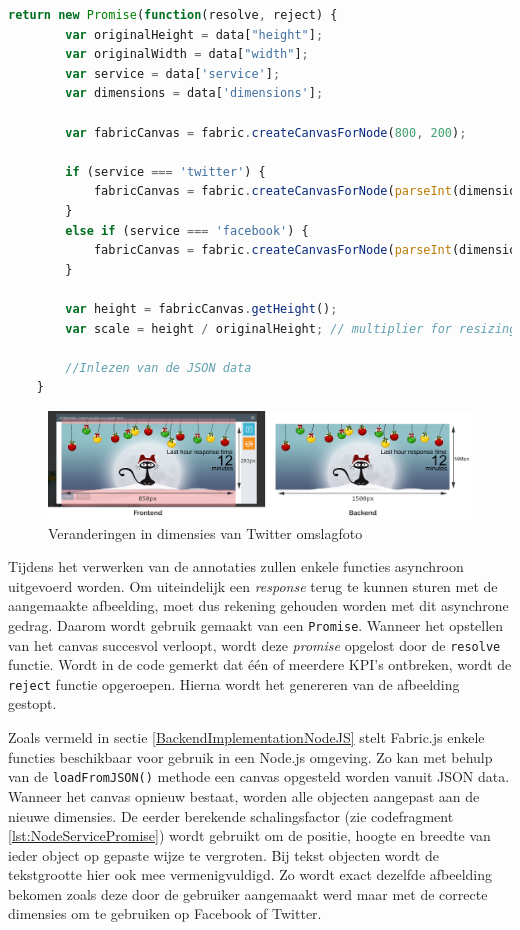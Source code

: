 \begin{lstlisting}[caption={renderer.js - Image renderer},label=lst:NodeServicePromise,language=javascript]
	return new Promise(function(resolve, reject) {
		var originalHeight = data["height"];
		var originalWidth = data["width"];
		var service = data['service'];
		var dimensions = data['dimensions'];
		
		var fabricCanvas = fabric.createCanvasForNode(800, 200);
		
		if (service === 'twitter') {
			fabricCanvas = fabric.createCanvasForNode(parseInt(dimensions.width), parseInt(dimensions.height));
		}
		else if (service === 'facebook') {
			fabricCanvas = fabric.createCanvasForNode(parseInt(dimensions.width),  parseInt(dimensions.height));
		}
		
		var height = fabricCanvas.getHeight();
		var scale = height / originalHeight; // multiplier for resizing canvas + objects
		
		//Inlezen van de JSON data
	}
\end{lstlisting}

\begin{figure}[H]
	\centering
	\includegraphics[width=1\textwidth]{Figuren/FrontToBack.png}
	\caption{Veranderingen in dimensies van Twitter omslagfoto}
	\label{fig:FrontToBackend}
\end{figure} 

Tijdens het verwerken van de annotaties zullen enkele functies asynchroon uitgevoerd worden. Om uiteindelijk een \textit{response} terug te kunnen sturen met de aangemaakte afbeelding, moet dus rekening gehouden worden met dit asynchrone gedrag. Daarom wordt gebruik gemaakt van een \texttt{Promise}. Wanneer het opstellen van het canvas succesvol verloopt, wordt deze \textit{promise} opgelost door de \texttt{resolve} functie. Wordt in de code gemerkt dat \'{e}\'{e}n of meerdere KPI's ontbreken, wordt de \texttt{reject} functie opgeroepen. Hierna wordt het genereren van de afbeelding gestopt.

Zoals vermeld in sectie \ref{BackendImplementationNodeJS} stelt Fabric.js enkele functies beschikbaar voor gebruik in een Node.js omgeving. Zo kan met behulp van de \texttt{loadFromJSON()} methode een canvas opgesteld worden vanuit JSON data. Wanneer het canvas opnieuw bestaat, worden alle objecten aangepast aan de nieuwe dimensies. De eerder berekende schalingsfactor (zie codefragment \ref{lst:NodeServicePromise}) wordt gebruikt om de positie, hoogte en breedte van ieder object op gepaste wijze te vergroten. Bij tekst objecten wordt de tekstgrootte hier ook mee vermenigvuldigd. Zo wordt exact dezelfde afbeelding bekomen zoals deze door de gebruiker aangemaakt werd maar met de correcte dimensies om te gebruiken op Facebook of Twitter. 

